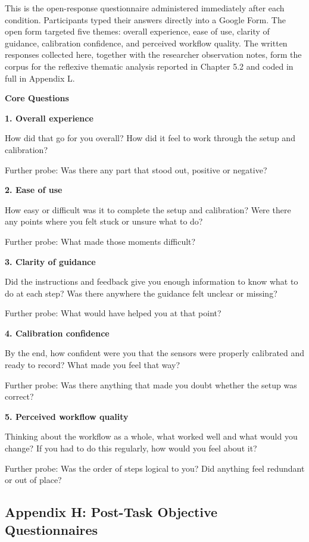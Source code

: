 \documentclass[
]{article}
\begin{document}
This is the open-response questionnaire administered immediately after each condition. Participants typed their answers directly into a Google Form. The open form targeted five themes: overall experience, ease of use, clarity of guidance, calibration confidence, and perceived workflow quality. The written responses collected here, together with the researcher observation notes, form the corpus for the reflexive thematic analysis reported in Chapter 5.2 and coded in full in Appendix L.

\textbf{Core Questions}

\textbf{1. Overall experience}

How did that go for you overall? How did it feel to work through the setup and calibration?

Further probe: Was there any part that stood out, positive or negative?

\textbf{2. Ease of use}

How easy or difficult was it to complete the setup and calibration? Were there any points where you felt stuck or unsure what to do?

Further probe: What made those moments difficult?

\textbf{3. Clarity of guidance}

Did the instructions and feedback give you enough information to know what to do at each step? Was there anywhere the guidance felt unclear or missing?

Further probe: What would have helped you at that point?

\textbf{4. Calibration confidence}

By the end, how confident were you that the sensors were properly calibrated and ready to record? What made you feel that way?

Further probe: Was there anything that made you doubt whether the setup was correct?

\textbf{5. Perceived workflow quality}

Thinking about the workflow as a whole, what worked well and what would you change? If you had to do this regularly, how would you feel about it?

Further probe: Was the order of steps logical to you? Did anything feel redundant or out of place?

\clearpage
\hypertarget{appendix-g-post-task-objective-questionnaires}{%
\subsection{\texorpdfstring{Appendix H: Post-Task Objective Questionnaires }{Appendix H: Post-Task Objective Questionnaires }}\label{appendix-g-post-task-objective-questionnaires}}
\end{document}
